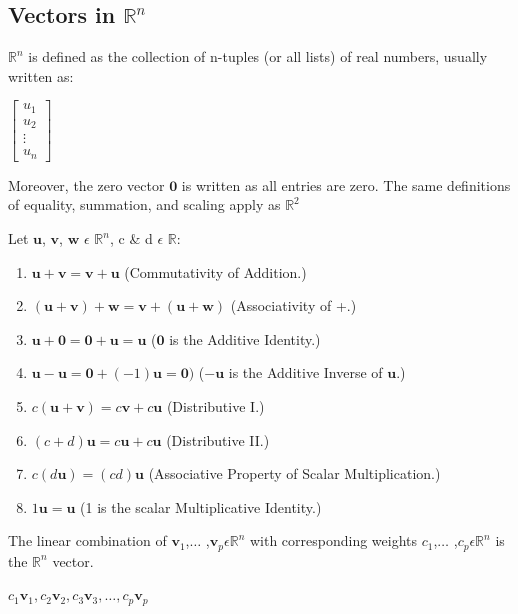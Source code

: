 \documentclass{report}
\begin{document}
\subsection*{Vectors in $\mathbb{R}^n$}
\begin{definition}[$\mathbb{R}^n$]
	$\mathbb{R}^n$ is defined as the collection of n-tuples (or all lists) of real numbers, usually written as:
	\begin{center}
		$\begin{bmatrix}
			u_1 \\
			u_2 \\
			\vdots \\
			u_n
		\end{bmatrix}$
	\end{center}
	Moreover, the zero vector $\mathbf{0}$ is written as all entries are zero. The same definitions of equality, summation, and scaling apply as $\mathbb{R}^2$
\end{definition}
\begin{theorem}
	Let $\mathbf{u}$, $\mathbf{v}$, $\mathbf{w}$ $\epsilon$ $\mathbb{R}^n$, c \& d $\epsilon$ $\mathbb{R}$:
	\begin{enumerate}
		\item $\mathbf{u} + \mathbf{v} = \mathbf{v} + \mathbf{u}$  (Commutativity of Addition.)
		\item $(\mathbf{u} + \mathbf{v}) + \mathbf{w} = \mathbf{v} + (\mathbf{u} + \mathbf{w})$  (Associativity of +.)
		\item $\mathbf{u} + \mathbf{0} = \mathbf{0} + \mathbf{u} = \mathbf{u}$  ($\mathbf{0}$ is the Additive Identity.)
		\item $\mathbf{u} - \mathbf{u} = \mathbf{0} + (-1)\mathbf{u} = \mathbf{0})$  ($-\mathbf{u}$ is the Additive Inverse of $\mathbf{u}$.)
		\item $c(\mathbf{u} + \mathbf{v}) = c\mathbf{v} + c\mathbf{u}$  (Distributive I.)
		\item $(c+d)\mathbf{u}  = c\mathbf{u} + c\mathbf{u}$  (Distributive II.)
		\item $c(d\mathbf{u}) = (cd)\mathbf{u}$  (Associative Property of Scalar Multiplication.)
		\item $1\mathbf{u} = \mathbf{u}$  (1 is the scalar Multiplicative Identity.)
	\end{enumerate}
\end{theorem}
\begin{definition}
	The linear combination of $\mathbf{v}_1$,$\ldots$ ,$\mathbf{v}_p \epsilon \mathbb{R}^n$ with corresponding weights $c_1$,$\ldots$ ,$c_p \epsilon \mathbb{R}^n$ is the $\mathbb{R}^n$ vector.
	\begin{center}
		$c_1\mathbf{v}_1,c_2\mathbf{v}_2, c_3\mathbf{v}_3, \ldots ,c_p\mathbf{v}_p$
	\end{center}
\end{definition}
\end{document}
